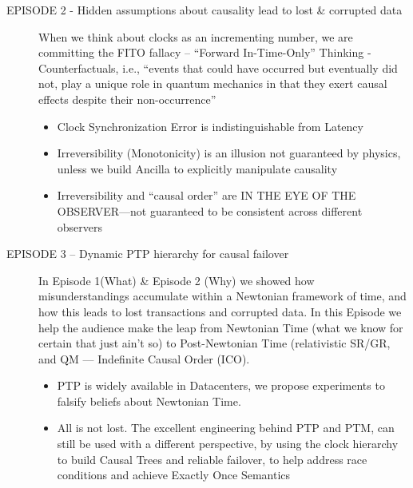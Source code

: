 \documentclass[../../../OAE-SPEC-MAIN.tex]{subfiles}
\begin{document}
\begin{description}
\item [EPISODE 2 - Hidden assumptions about causality lead to lost \& corrupted data] \mbox{}

When we think about clocks as an incrementing number, we are committing the FITO fallacy -- ``Forward In-Time-Only'' Thinking
- Counterfactuals, i.e., “events that could have occurred but eventually did not, play a unique role in quantum mechanics in that they exert causal effects despite their non-occurrence”
	\begin{itemize}
	\item  Clock Synchronization Error is indistinguishable from Latency
	\item  Irreversibility (Monotonicity) is an illusion not guaranteed by physics, unless we build Ancilla to explicitly manipulate causality
	\item  Irreversibility and “causal order” are IN THE EYE OF THE OBSERVER—not guaranteed to be consistent across different observers
	\end{itemize}
\item [EPISODE 3 -- Dynamic PTP hierarchy for causal failover] \mbox{}

In Episode 1(What) \& Episode 2 (Why) we showed how misunderstandings accumulate within a Newtonian framework of time, and how this leads to lost transactions and corrupted data. In this Episode we help the audience make the leap from Newtonian Time (what we know for certain that just ain't so) to Post-Newtonian Time (relativistic SR/GR, and QM — Indefinite Causal Order (ICO).
	\begin{itemize}
	\item PTP is widely available in Datacenters, we propose experiments to falsify beliefs about Newtonian Time.
	\item All is not lost. The excellent engineering behind PTP and PTM, can still be used with a different perspective, by using the clock hierarchy to build Causal Trees and reliable failover, to help address race conditions and achieve Exactly Once Semantics
	\end{itemize}
	

\end{description}
\end{document}
